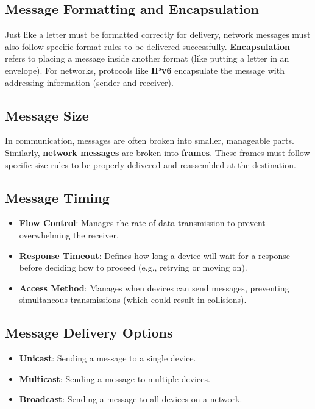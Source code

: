 \documentclass[a4paper,11pt]{article}
\begin{document}
\subsection{Message Formatting and Encapsulation}
Just like a letter must be formatted correctly for delivery, network messages must also follow specific format rules to be delivered successfully. \textbf{Encapsulation} refers to placing a message inside another format (like putting a letter in an envelope). For networks, protocols like \textbf{IPv6} encapsulate the message with addressing information (sender and receiver).\\

\subsection{Message Size}
In communication, messages are often broken into smaller, manageable parts. Similarly, \textbf{network messages} are broken into \textbf{frames}. These frames must follow specific size rules to be properly delivered and reassembled at the destination.\\

\subsection{Message Timing}
\begin{itemize}
    \item \textbf{Flow Control}: Manages the rate of data transmission to prevent overwhelming the receiver.\\
    \item \textbf{Response Timeout}: Defines how long a device will wait for a response before deciding how to proceed (e.g., retrying or moving on).\\
    \item \textbf{Access Method}: Manages when devices can send messages, preventing simultaneous transmissions (which could result in collisions).\\
\end{itemize}

\subsection{Message Delivery Options}
\begin{itemize}
    \item \textbf{Unicast}: Sending a message to a single device.\\
    \item \textbf{Multicast}: Sending a message to multiple devices.\\
    \item \textbf{Broadcast}: Sending a message to all devices on a network.\\
\end{itemize}
\end{document}
